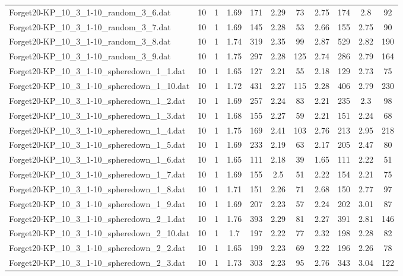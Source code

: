 \begin{table}[!ht]
\begin{tabular}{lcccccccccc}
Forget20-KP\_10\_3\_1-10\_random\_3\_6.dat & 10 & 1 & 1.69 & 171 & 2.29 & 73 & 2.75 & 174 & 2.8 & 92 \\
Forget20-KP\_10\_3\_1-10\_random\_3\_7.dat & 10 & 1 & 1.69 & 145 & 2.28 & 53 & 2.66 & 155 & 2.75 & 90 \\
Forget20-KP\_10\_3\_1-10\_random\_3\_8.dat & 10 & 1 & 1.74 & 319 & 2.35 & 99 & 2.87 & 529 & 2.82 & 190 \\
Forget20-KP\_10\_3\_1-10\_random\_3\_9.dat & 10 & 1 & 1.75 & 297 & 2.28 & 125 & 2.74 & 286 & 2.79 & 164 \\
Forget20-KP\_10\_3\_1-10\_spheredown\_1\_1.dat & 10 & 1 & 1.65 & 127 & 2.21 & 55 & 2.18 & 129 & 2.73 & 75 \\
Forget20-KP\_10\_3\_1-10\_spheredown\_1\_10.dat & 10 & 1 & 1.72 & 431 & 2.27 & 115 & 2.28 & 406 & 2.79 & 230 \\
Forget20-KP\_10\_3\_1-10\_spheredown\_1\_2.dat & 10 & 1 & 1.69 & 257 & 2.24 & 83 & 2.21 & 235 & 2.3 & 98 \\
Forget20-KP\_10\_3\_1-10\_spheredown\_1\_3.dat & 10 & 1 & 1.68 & 155 & 2.27 & 59 & 2.21 & 151 & 2.24 & 68 \\
Forget20-KP\_10\_3\_1-10\_spheredown\_1\_4.dat & 10 & 1 & 1.75 & 169 & 2.41 & 103 & 2.76 & 213 & 2.95 & 218 \\
Forget20-KP\_10\_3\_1-10\_spheredown\_1\_5.dat & 10 & 1 & 1.69 & 233 & 2.19 & 63 & 2.17 & 205 & 2.47 & 80 \\
Forget20-KP\_10\_3\_1-10\_spheredown\_1\_6.dat & 10 & 1 & 1.65 & 111 & 2.18 & 39 & 1.65 & 111 & 2.22 & 51 \\
Forget20-KP\_10\_3\_1-10\_spheredown\_1\_7.dat & 10 & 1 & 1.69 & 155 & 2.5 & 51 & 2.22 & 154 & 2.21 & 75 \\
Forget20-KP\_10\_3\_1-10\_spheredown\_1\_8.dat & 10 & 1 & 1.71 & 151 & 2.26 & 71 & 2.68 & 150 & 2.77 & 97 \\
Forget20-KP\_10\_3\_1-10\_spheredown\_1\_9.dat & 10 & 1 & 1.69 & 207 & 2.23 & 57 & 2.24 & 202 & 3.01 & 87 \\
Forget20-KP\_10\_3\_1-10\_spheredown\_2\_1.dat & 10 & 1 & 1.76 & 393 & 2.29 & 81 & 2.27 & 391 & 2.81 & 146 \\
Forget20-KP\_10\_3\_1-10\_spheredown\_2\_10.dat & 10 & 1 & 1.7 & 197 & 2.22 & 77 & 2.32 & 198 & 2.28 & 82 \\
Forget20-KP\_10\_3\_1-10\_spheredown\_2\_2.dat & 10 & 1 & 1.65 & 199 & 2.23 & 69 & 2.22 & 196 & 2.26 & 78 \\
Forget20-KP\_10\_3\_1-10\_spheredown\_2\_3.dat & 10 & 1 & 1.73 & 303 & 2.23 & 95 & 2.76 & 343 & 3.04 & 122 \\

\end{tabular}
\end{table}
